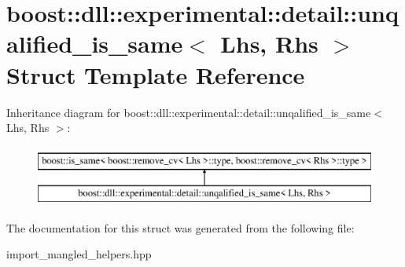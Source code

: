 \hypertarget{a00325}{}\section{boost\+:\+:dll\+:\+:experimental\+:\+:detail\+:\+:unqalified\+\_\+is\+\_\+same$<$ Lhs, Rhs $>$ Struct Template Reference}
\label{a00325}
Inheritance diagram for boost\+:\+:dll\+:\+:experimental\+:\+:detail\+:\+:unqalified\+\_\+is\+\_\+same$<$ Lhs, Rhs $>$\+:\begin{figure}[H]
\begin{center}
\leavevmode
\includegraphics[height=2.000000cm]{a00325}
\end{center}
\end{figure}


The documentation for this struct was generated from the following file\+:\begin{DoxyCompactItemize}
\item 
import\+\_\+mangled\+\_\+helpers.\+hpp\end{DoxyCompactItemize}
